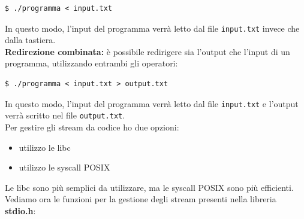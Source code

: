 \begin{verbatim}
$ ./programma < input.txt
\end{verbatim}
In questo modo, l'input del programma verrà letto dal file \texttt{input.txt} invece che dalla tastiera.\\
\textbf{Redirezione combinata:} è possibile redirigere sia l'output che l'input di un programma, utilizzando entrambi gli operatori:
\begin{verbatim}
$ ./programma < input.txt > output.txt
\end{verbatim}
In questo modo, l'input del programma verrà letto dal file \texttt{input.txt} e l'output verrà scritto nel file \texttt{output.txt}.\\
Per gestire gli stream da codice ho due opzioni:
\begin{itemize}
    \item utilizzo le libc
    \item utilizzo le syscall POSIX
\end{itemize}
Le libc sono più semplici da utilizzare, ma le syscall POSIX sono più efficienti. 
Vediamo ora le funzioni per la gestione degli stream presenti nella libreria \textbf{stdio.h}:
